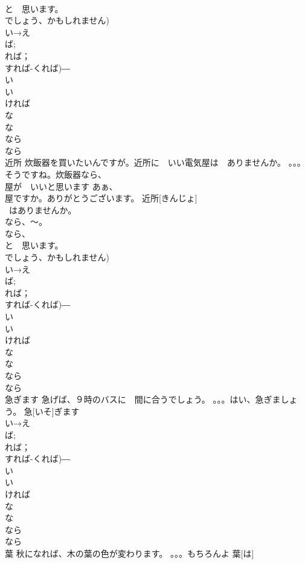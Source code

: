 \documentclass[8pt]{extreport}
\begin{document}
\begin{CJK}{UTF8}{min}
\\	と　思います。
\\	でしょう、かもしれません)	
\\	い→え
\\	ば;
\\	れば；
\\	すれば-くれば)―　
\\	い
\\	い　
\\	ければ　
\\	な 
\\	な
\\	なら　
\\	なら
\\	近所	炊飯器を買いたいんですが。近所に　いい電気屋は　ありませんか。 。。。そうですね。炊飯器なら、
\\	屋が　いいと思います あぁ、
\\	屋ですか。ありがとうございます。	近所[きんじょ]			
\\	~はありませんか。
\\	なら、～。
\\	なら、
\\	と　思います。
\\	でしょう、かもしれません)	
\\	い→え
\\	ば;
\\	れば；
\\	すれば-くれば)―　
\\	い
\\	い　
\\	ければ　
\\	な 
\\	な
\\	なら　
\\	なら
\\	急ぎます	急げば、９時のバスに　間に合うでしょう。 。。。はい、急ぎましょう。	急[いそ]ぎます			
\\	い→え
\\	ば;
\\	れば；
\\	すれば-くれば)―　
\\	い
\\	い　
\\	ければ　
\\	な 
\\	な
\\	なら　
\\	なら
\\	葉	秋になれば、木の葉の色が変わります。 。。。もちろんよ	葉[は]			

\end{CJK}
\end{document}
